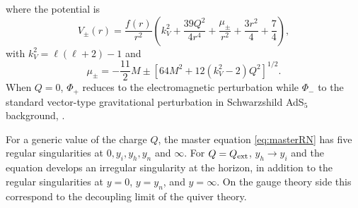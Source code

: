 \documentclass[11pt]{article}
\numberwithin{equation}{section}
\begin{document}
where the potential is 
\begin{equation}
V_{\pm}(r)= \frac{f(r)}{r^2}\left(k_V^2+\frac{39 Q^2}{4 r^4}+\frac{\mu_{\pm}}{r^2}+\frac{3 r^2}{4}+\frac{7}{4}\right),
\end{equation}
with $k_V^2=\ell(\ell+2)-1$ and 
%
\begin{equation}
\mu_{\pm}=-\frac{11}{2}M\pm\left[64M^2+12(k_V^2-2)Q^2\right]^{1/2}.
\end{equation}
When $Q=0$, $\Phi_+$ reduces to the electromagnetic perturbation while $\Phi_-$ to the standard vector-type gravitational perturbation in Schwarzshild AdS$_5$ background, \cite[eq.~(4.40)]{Kodama:2003kk}.

For a generic value of the charge $Q$, the master equation \eqref{eq:masterRN} has five regular singularities at $0,y_i,y_h, y_n$ and $\infty$. For $Q=Q_{\rm ext}$, $y_h\to y_i$ and  the equation develops an irregular singularity at the horizon, in addition to the regular singularities at $y=0$, $y=y_n$, and $y=\infty$. On the gauge theory side this correspond to the decoupling limit of the quiver theory.
\end{document}
